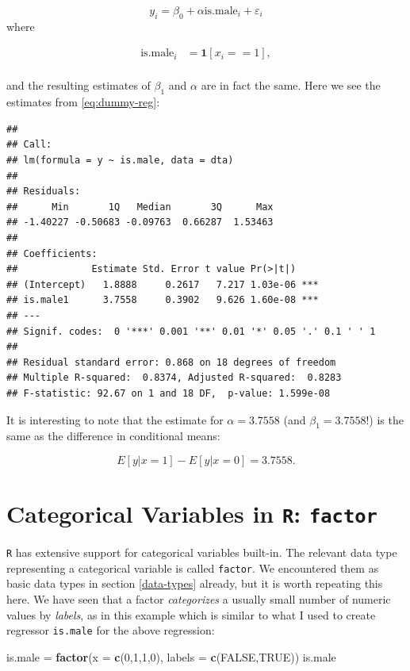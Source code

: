 \documentclass[]{book}
\newenvironment{Shaded}{\begin{snugshade}}{\end{snugshade}}
\newcommand{\KeywordTok}[1]{\textcolor[rgb]{0.13,0.29,0.53}{\textbf{#1}}}
\newcommand{\DataTypeTok}[1]{\textcolor[rgb]{0.13,0.29,0.53}{#1}}
\newcommand{\DecValTok}[1]{\textcolor[rgb]{0.00,0.00,0.81}{#1}}
\newcommand{\StringTok}[1]{\textcolor[rgb]{0.31,0.60,0.02}{#1}}
\newcommand{\OtherTok}[1]{\textcolor[rgb]{0.56,0.35,0.01}{#1}}
\newcommand{\NormalTok}[1]{#1}
\theoremstyle{definition}
\theoremstyle{definition}
\theoremstyle{definition}
\theoremstyle{remark}
\begin{document}
\[
y_i = \beta_0 + \alpha \text{is.male}_i + \varepsilon_i \label{eq:dummy-reg}
\] where

\begin{align*}
\text{is.male}_i &= \mathbf{1}[x_i==1], \\
\end{align*}

and the resulting estimates of \(\beta_1\) and \(\alpha\) are in fact
the same. Here we see the estimates from \eqref{eq:dummy-reg}:

\begin{verbatim}
## 
## Call:
## lm(formula = y ~ is.male, data = dta)
## 
## Residuals:
##      Min       1Q   Median       3Q      Max 
## -1.40227 -0.50683 -0.09763  0.66287  1.53463 
## 
## Coefficients:
##             Estimate Std. Error t value Pr(>|t|)    
## (Intercept)   1.8888     0.2617   7.217 1.03e-06 ***
## is.male1      3.7558     0.3902   9.626 1.60e-08 ***
## ---
## Signif. codes:  0 '***' 0.001 '**' 0.01 '*' 0.05 '.' 0.1 ' ' 1
## 
## Residual standard error: 0.868 on 18 degrees of freedom
## Multiple R-squared:  0.8374, Adjusted R-squared:  0.8283 
## F-statistic: 92.67 on 1 and 18 DF,  p-value: 1.599e-08
\end{verbatim}

It is interesting to note that the estimate for \(\alpha = 3.7558\) (and
\(\beta_1 = 3.7558\)!) is the same as the difference in conditional
means:

\[E[y|x=1] - E[y|x=0]=3.7558.\]

\section{\texorpdfstring{Categorical Variables in \texttt{R}:
\texttt{factor}}{Categorical Variables in R: factor}}\label{categorical-variables-in-r-factor}

\texttt{R} has extensive support for categorical variables built-in. The
relevant data type representing a categorical variable is called
\texttt{factor}. We encountered them as basic data types in section
\ref{data-types} already, but it is worth repeating this here. We have
seen that a factor \emph{categorizes} a usually small number of numeric
values by \emph{labels}, as in this example which is similar to what I
used to create regressor \texttt{is.male} for the above regression:

\begin{Shaded}
\begin{Highlighting}[]
\NormalTok{is.male =}\StringTok{ }\KeywordTok{factor}\NormalTok{(}\DataTypeTok{x =} \KeywordTok{c}\NormalTok{(}\DecValTok{0}\NormalTok{,}\DecValTok{1}\NormalTok{,}\DecValTok{1}\NormalTok{,}\DecValTok{0}\NormalTok{), }\DataTypeTok{labels =} \KeywordTok{c}\NormalTok{(}\OtherTok{FALSE}\NormalTok{,}\OtherTok{TRUE}\NormalTok{))}
\NormalTok{is.male}
\end{Highlighting}
\end{Shaded}
\end{document}
